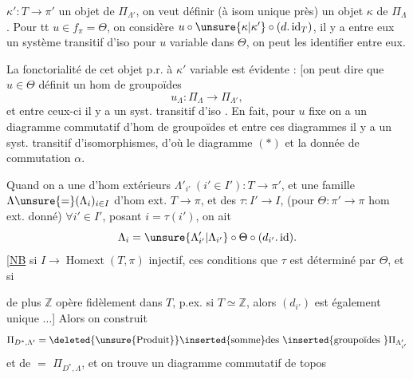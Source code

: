  \(\kappa':T\longrightarrow\pi'\) un objet de \(\Pi_{\Lambda'}\),
on veut définir (à isom unique près) un
objet \(\kappa\) de \(\Pi_\Lambda\). Pour tt \(u\in f_\pi=\Theta\),
on considère \(u\circ\unsure{\kappa|\kappa'}\circ(d.\operatorname{id}_T)\), il y a entre eux
un système transitif d'iso pour \(u\) variable
dans \(\Theta\), on peut les identifier entre eux.

La fonctorialité de cet objet p.r. à
\(\kappa'\) variable est évidente : [on peut dire que
\(u\in\Theta\) définit un hom de groupoïdes
\[
u_\Lambda:\Pi_\Lambda\longrightarrow\Pi_{\Lambda'},
\]
et entre ceux-ci
il y a un syst. transitif d'iso \unsure{\}}. En fait,
pour \(u\) fixe on a un  diagramme
commutatif d'hom de groupoïdes
et entre ces diagrammes il y a un
syst. transitif d'isomorphismes, d'où
le diagramme \((*)\) et la donnée
de commutation \(\alpha\).

Quand on a une   d'hom
extérieurs \(\Lambda'_{i'}\ (i'\in I'):T\longrightarrow\pi'\), et une
famille \(\Lambda\unsure{=}(\Lambda_i)_{i\in I}\) d'hom ext. \(T\longrightarrow\pi\), et des
\(\tau:I'\longrightarrow I\), 
(pour \(\Theta:\pi'\longrightarrow\pi\) hom ext. donné)
\(\forall i'\in I'\), posant \(i=\tau(i')\), on ait
\[
\Lambda_i=\unsure{\Lambda'_{i'}|\Lambda_{i'}}\circ\Theta\circ(d_{i'}.\operatorname{id}).
\]
[\uline{NB} si \(I\longrightarrow\operatorname{Homext}(T,\pi)\) injectif, ces conditions
 que \(\tau\) est déterminé par \(\Theta\), et si

de plus \(\mathbb Z\) opère fidèlement dans \(T\), p.ex.
si \(T\simeq\mathbb Z\), alors \((d_{i'})\) est également unique \(\ldots\)]
Alors on construit 
\[
\Pi_{D^*,\Lambda'}=
\deleted{\text{\unsure{Produit}}}\inserted{\text{somme}} \text{des }\inserted{\text{groupoïdes }}\Pi_{\Lambda'_{i'}}
\]
et de \(=\) \(\Pi_{D^*,\Lambda}\), et on trouve un
diagramme commutatif de topos

